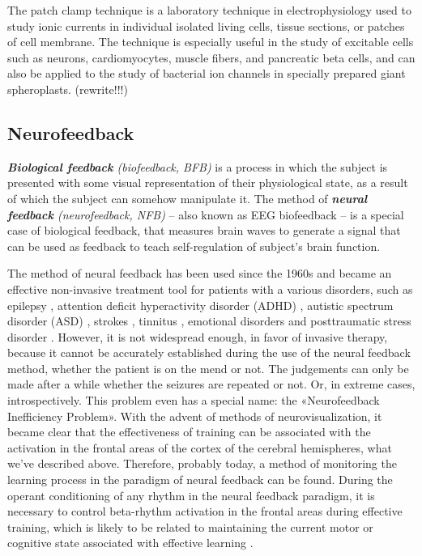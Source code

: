 \documentclass[14pt,a4paper]{scrartcl}
\begin{document}
The patch clamp technique is a laboratory technique in electrophysiology used to study ionic currents in individual isolated living cells, tissue sections, or patches of cell membrane. The technique is especially useful in the study of excitable cells such as neurons, cardiomyocytes, muscle fibers, and pancreatic beta cells, and can also be applied to the study of bacterial ion channels in specially prepared giant spheroplasts. (rewrite!!!)

\subsection{Neurofeedback}
\label{sec:Hypothesis:Neurofeedback}

\textit{\textbf{Biological feedback} (biofeedback, BFB)} is a process in which the subject is presented with some visual representation of their physiological state, as a result of which the subject can somehow manipulate it. The method of \textit{\textbf{neural feedback} (neurofeedback, NFB)} – also known as EEG biofeedback – is a special case of biological feedback, that measures brain waves to generate a signal that can be used as feedback to teach self-regulation of subject's brain function. 

The method of neural feedback has been used since the 1960s and became an effective non-invasive treatment tool for patients with a various disorders, such as epilepsy \cite{Strehl2014,Kotchoubey2001}, attention deficit hyperactivity disorder (ADHD) \cite{Leins2007,Sonuga-Barke2013,Thompson2005}, autistic spectrum disorder (ASD) \cite{Kouijzer2009,Thompson2009}, strokes \cite{Rayegani2014}, tinnitus \cite{Hartmann2014}, emotional disorders \cite{Raymond2005} and posttraumatic stress disorder \cite{Othmer2009}. However, it is not widespread enough, in favor of invasive therapy, because it cannot be accurately established during the use of the neural feedback method, whether the patient is on the mend or not. The judgements can only be made after a while whether the seizures are repeated or not. Or, in extreme cases, introspectively. This problem even has a special name: the «Neurofeedback Inefficiency Problem». With the advent of methods of neurovisualization, it became clear that the effectiveness of training can be associated with the activation in the frontal areas of the cortex of the cerebral hemispheres, what we’ve described above. Therefore, probably today, a method of monitoring the learning process in the paradigm of neural feedback can be found. During the operant conditioning of any rhythm in the neural feedback paradigm, it is necessary to control beta-rhythm activation in the frontal areas during effective training, which is likely to be related to maintaining the current motor or cognitive state associated with effective learning \cite{Engel2010}.
\end{document}
